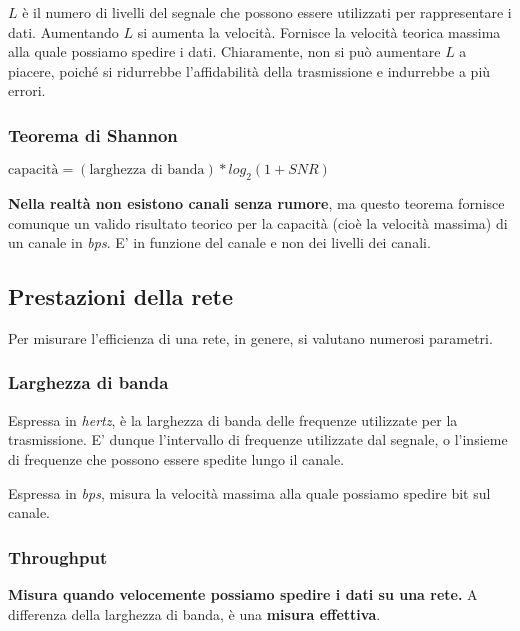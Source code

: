             \(L\) è il numero di livelli del segnale che possono essere utilizzati per rappresentare i dati. Aumentando \(L\) si aumenta la velocità. Fornisce la velocità teorica massima alla quale possiamo spedire i dati. Chiaramente, non si può aumentare \(L\) a piacere, poiché si ridurrebbe l'affidabilità della trasmissione e indurrebbe a più errori.
        
        \subsubsection{Teorema di Shannon}
        
            \(\text{capacità}=(\text{larghezza di banda})*log_2 (1+SNR)\)
            
            \vspace{3mm}
            
            \textbf{Nella realtà non esistono canali senza rumore}, ma questo teorema fornisce comunque un valido risultato teorico per la capacità (cioè la velocità massima) di un canale in \textit{bps}. E' in funzione del canale e non dei livelli dei canali.
            
    \subsection{Prestazioni della rete}    
        
        Per misurare l'efficienza di una rete, in genere, si valutano numerosi parametri.
        
        \subsubsection{Larghezza di banda}
        
            Espressa in \textit{hertz}, è la larghezza di banda delle frequenze utilizzate per la trasmissione. E' dunque l'intervallo di frequenze utilizzate dal segnale, o l'insieme di frequenze che possono essere spedite lungo il canale.
            
            Espressa in \textit{bps}, misura la velocità massima alla quale possiamo spedire bit sul canale.
            
        \subsubsection{Throughput}
        
            \textbf{Misura quando velocemente possiamo spedire i dati su una rete.} A differenza della larghezza di banda, è una \textbf{misura effettiva}.
            
